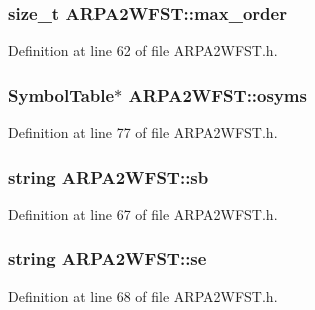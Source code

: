 \subsubsection[{max\+\_\+order}]{\setlength{\rightskip}{0pt plus 5cm}size\+\_\+t A\+R\+P\+A2\+W\+F\+S\+T\+::max\+\_\+order}\hypertarget{class_a_r_p_a2_w_f_s_t_a0ce9ce2a2c963009a08cf35f73b1c159}{}\label{class_a_r_p_a2_w_f_s_t_a0ce9ce2a2c963009a08cf35f73b1c159}


Definition at line 62 of file A\+R\+P\+A2\+W\+F\+S\+T.\+h.

\subsubsection[{osyms}]{\setlength{\rightskip}{0pt plus 5cm}Symbol\+Table$\ast$ A\+R\+P\+A2\+W\+F\+S\+T\+::osyms}\hypertarget{class_a_r_p_a2_w_f_s_t_ac115a6b73de97772d853c3ce9470832d}{}\label{class_a_r_p_a2_w_f_s_t_ac115a6b73de97772d853c3ce9470832d}


Definition at line 77 of file A\+R\+P\+A2\+W\+F\+S\+T.\+h.

\subsubsection[{sb}]{\setlength{\rightskip}{0pt plus 5cm}string A\+R\+P\+A2\+W\+F\+S\+T\+::sb}\hypertarget{class_a_r_p_a2_w_f_s_t_a98d68ef7089bf028a9ec5ce8929a7e9a}{}\label{class_a_r_p_a2_w_f_s_t_a98d68ef7089bf028a9ec5ce8929a7e9a}


Definition at line 67 of file A\+R\+P\+A2\+W\+F\+S\+T.\+h.

\subsubsection[{se}]{\setlength{\rightskip}{0pt plus 5cm}string A\+R\+P\+A2\+W\+F\+S\+T\+::se}\hypertarget{class_a_r_p_a2_w_f_s_t_aaca67dc9e7b65acfb8aa24b542db8fe4}{}\label{class_a_r_p_a2_w_f_s_t_aaca67dc9e7b65acfb8aa24b542db8fe4}


Definition at line 68 of file A\+R\+P\+A2\+W\+F\+S\+T.\+h.

